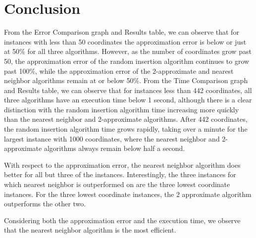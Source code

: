 \section{Conclusion}\label{conclusion}
From the Error Comparison graph and Results table, we can observe that for instances with less than 50 coordinates the approximation error is below or just at 50\% for all three algorithms. However, as the number of coordinates grow past 50, the approximation error of the random insertion algorithm continues to grow past 100\%, while the approximation error of the 2-approximate and nearest neighbor algorithms remain at or below 50\%. From the Time Comparison graph and Results table, we can observe that for instances less than 442 coordinates, all three algorithms have an execution time below 1 second, although there is a clear distinction with the random insertion algorithm time increasing more quickly than the nearest neighbor and 2-approximate algorithms. After 442 coordinates, the random insertion algorithm time grows rapidly, taking over a minute for the largest instance with 1000 coordinates, where the nearest neighbor and 2-approximate algorithms always remain below half a second. 
\linebreak

With respect to the approximation error, the nearest neighbor algorithm does better for all but three of the instances. Interestingly, the three instances for which nearest neighbor is outperformed on are the three lowest coordinate instances. For the three lowest coordinate instances, the 2 approximate algorithm outperforms the other two. 
\linebreak

Considering both the approximation error and the execution time, we observe that the nearest neighbor algorithm is the most efficient. 

\pagebreak